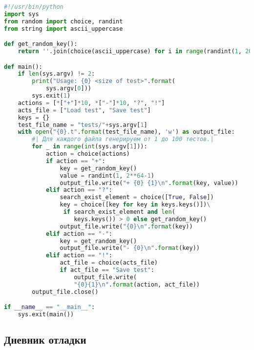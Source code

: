 \documentclass[12pt]{article}
\begin{document}
 \begin{lstlisting}[language=python, escapechar=|]
#!/usr/bin/python
import sys
from random import choice, randint
from string import ascii_uppercase

def get_random_key():
    return ''.join(choice(ascii_uppercase) for i in range(randint(1, 20)))

def main():
    if len(sys.argv) != 2:
        print("Usage: {0} <size of test>".format(
            sys.argv[0]))
        sys.exit(1)
    actions = [*["+"]*10, *["-"]*10, "?", "!"]
    acts_file = ["Load test", "Save test"]
    keys = {}
    test_file_name = "tests/"+sys.argv[1]
    with open("{0}.t".format(test_file_name), 'w') as output_file:
        #| Для каждого файла генерируем от 1 до 100 тестов.|
        for _ in range(int(sys.argv[1])):
            action = choice(actions)
            if action == "+":
                key = get_random_key()
                value = randint(1, 2**64-1)
                output_file.write("+ {0} {1}\n".format(key, value))
            elif action == "?":
                search_exist_element = choice([True, False])
                key = choice([key for key in keys.keys()])\
                 if search_exist_element and len(
                    keys.keys()) > 0 else get_random_key()
                output_file.write("{0}\n".format(key))
            elif action == "-":
                key = get_random_key()
                output_file.write("- {0}\n".format(key))
            elif action == "!":
                act_file = choice(acts_file)
                if act_file == "Save test":
                    output_file.write(
                    "{0}{1}\n".format(action, act_file))
        output_file.close()

if __name__ == "__main__":
    sys.exit(main())

 \end{lstlisting}

%
%
%

\subsection*{Дневник отладки}
\end{document}
